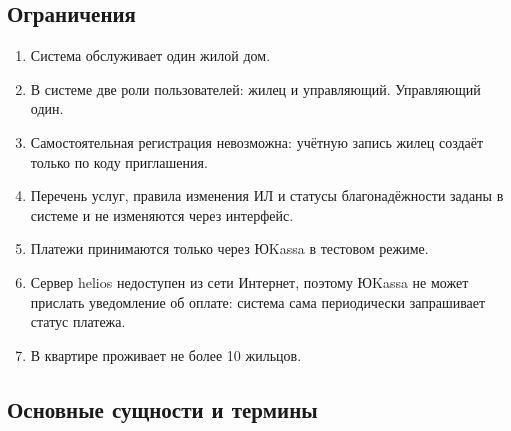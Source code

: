 \documentclass[12pt,a4paper]{article}
\begin{document}
\subsection{Ограничения}

\begin{enumerate}
  \item Система обслуживает один жилой дом.
  \item В системе две роли пользователей: жилец и управляющий. Управляющий один.
  \item Самостоятельная регистрация невозможна: учётную запись жилец создаёт
        только по коду приглашения.
  \item Перечень услуг, правила изменения ИЛ и статусы благонадёжности
        заданы в системе и не изменяются через интерфейс.
  \item Платежи принимаются только через ЮKassa в тестовом режиме.
  \item Сервер helios недоступен из сети Интернет, поэтому ЮKassa не может
        прислать уведомление об оплате: система сама периодически
        запрашивает статус платежа.
  \item В квартире проживает не более 10 жильцов.
\end{enumerate}

\subsection{Основные сущности и термины}
\end{document}
